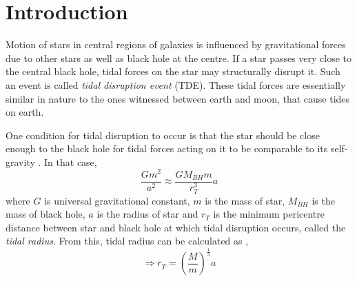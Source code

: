 \documentclass{tda}
\begin{document}

\section{Introduction} \label{introduction}

Motion of stars in central regions of galaxies is influenced by gravitational forces due to other stars as well as black hole at the centre. If a star passes very close to the central black hole, tidal forces on the star may structurally disrupt it. Such an event is called \emph{tidal disruption event} (TDE). These tidal forces are essentially similar in nature to the ones witnessed between earth and moon, that cause tides on earth. 

One condition for tidal disruption to occur is that the star should be close enough to the black hole for tidal forces acting on it to be comparable to its self-gravity \cite{hills_possible_1975}. In that case, 
\[\frac{G m^2}{a^2} \approx \frac{G M^{}_{BH} m}{r_{T}^3} a\]
where \(G\) is universal gravitational constant, \(m\) is the mass of star, \(M^{}_{BH}\) is the mass of black hole, \(a\) is the radius of star and \(r^{}_{T}\) is the minimum pericentre distance between star and black hole at which tidal disruption occurs, called the \emph{tidal radius}. From this, tidal radius can be calculated as \cite{rees_tidal_1988}, 
\begin{equation}
	\Rightarrow r^{}_{T} = \left( \frac{M}{m} \right) ^{\frac{1}{3}} a
	\label{eq:tidal_radius}
\end{equation}
\end{document}
